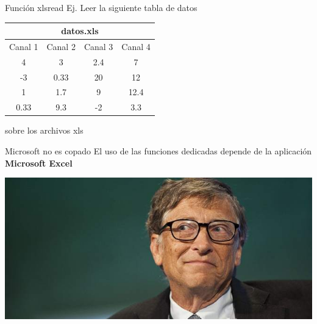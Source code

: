 \documentclass{bredelebeamer}
\begin{document}
\begin{frame}{Función xlsread}
Ej. Leer la siguiente tabla de datos
\begin{table}[]
\centering
\begin{tabular}{cccc}
\multicolumn{4}{c}{datos.xls}                                                                                              \\ \hline
\multicolumn{1}{|c|}{Canal 1} & \multicolumn{1}{c|}{Canal 2} & \multicolumn{1}{c|}{Canal 3} & \multicolumn{1}{c|}{Canal 4} \\ \hline
\multicolumn{1}{|c|}{4}      & \multicolumn{1}{c|}{3}      & \multicolumn{1}{c|}{2.4}    & \multicolumn{1}{c|}{7}       \\ \hline
\multicolumn{1}{|c|}{-3}     & \multicolumn{1}{c|}{0.33}   & \multicolumn{1}{c|}{20}     & \multicolumn{1}{c|}{12}      \\ \hline
\multicolumn{1}{|c|}{1}      & \multicolumn{1}{c|}{1.7}    & \multicolumn{1}{c|}{9}      & \multicolumn{1}{c|}{12.4}    \\ \hline
\multicolumn{1}{|c|}{0.33}   & \multicolumn{1}{c|}{9.3}    & \multicolumn{1}{c|}{-2}     & \multicolumn{1}{c|}{3.3}     \\ \hline
\end{tabular}
\end{table}
\begin{center}

\end{center}
\end{frame}

\begin{frame}{sobre los archivos xls}
\begin{alertblock}{Microsoft no es copado}
El uso de las funciones dedicadas depende de la aplicación \textbf{Microsoft Excel}
\end{alertblock}
\begin{center}
\includegraphics[scale=0.4]{images/bill}
\end{center}
\end{frame}
\end{document}
